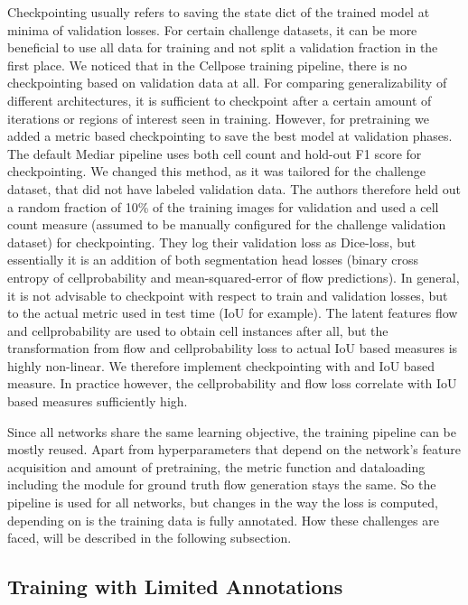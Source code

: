 Checkpointing usually refers to saving the state dict of the trained model at minima of validation losses. For certain challenge datasets, it can be more beneficial to use all data for training and not split a validation fraction in the first place. We noticed that in the Cellpose training pipeline, there is no checkpointing based on validation data at all. For comparing generalizability of different architectures, it is sufficient to checkpoint after a certain amount of iterations or regions of interest seen in training. However, for pretraining we added a metric based checkpointing to save the best model at validation phases. The default Mediar pipeline uses both cell count and hold-out F1 score for checkpointing. We changed this method, as it was tailored for the challenge dataset, that did not have labeled validation data. The authors therefore held out a random fraction of 10\% of the training images for validation and used a cell count measure (assumed to be manually configured for the challenge validation dataset) for checkpointing. They log their validation loss as Dice-loss, but essentially it is an addition of both segmentation head losses (binary cross entropy of cellprobability and mean-squared-error of flow predictions). In general, it is not advisable to checkpoint with respect to train and validation losses, but to the actual metric used in test time (IoU for example). The latent features flow and cellprobability are used to obtain cell instances after all, but the transformation from flow and cellprobability loss to actual IoU based measures is highly non-linear. We therefore implement checkpointing with and IoU based measure. In practice however, the cellprobability and flow loss correlate with IoU based measures sufficiently high.


\vspace{1em} %

Since all networks share the same learning objective, the training pipeline can be mostly reused. Apart from hyperparameters that depend on the network's feature acquisition and amount of pretraining, the metric function and dataloading including the module for ground truth flow generation stays the same. So the pipeline is used for all networks, but  changes in the way the loss is computed, depending on is the training data is fully annotated. How these challenges are faced, will be described in the following subsection.

\subsection{Training with Limited Annotations}

